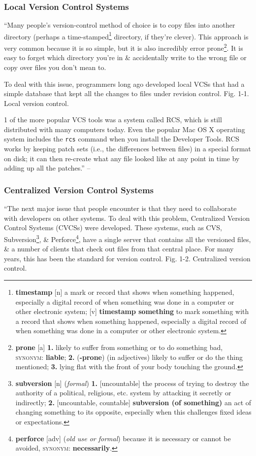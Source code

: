 \documentclass[oneside]{book}
\numberwithin{equation}{section}
\begin{document}
\subsubsection{Local Version Control Systems}
``Many people's version-control method of choice is to copy files into another directory (perhaps a time-stamped\footnote{\textbf{timestamp} [n] a mark or record that shows when something happened, especially a digital record of when something was done in a computer or other electronic system; [v] \textbf{timestamp something} to mark something with a record that shows when something happened, especially a digital record of when something was done in a computer or other electronic system.} directory, if they're clever). This approach is very common because it is so simple, but it is also incredibly error prone\footnote{\textbf{prone} [a] \textbf{1.} likely to suffer from something or to do something bad, \textsc{synonym}: \textbf{liable}; \textbf{2.} (\textbf{-prone}) (in adjectives) likely to suffer or do the thing mentioned; \textbf{3.} lying flat with the front of your body touching the ground.}. It is easy to forget which directory you're in \& accidentally write to the wrong file or copy over files you don't mean to.

To deal with this issue, programmers long ago developed local VCSs that had a simple database that kept all the changes to files under revision control. \textsf{Fig. 1-1. Local version control}.

1 of the more popular VCS tools was a system called RCS, which is still distributed with many computers today. Even the popular Mac OS X operating system includes the \texttt{rcs} command when you install the Developer Tools. RCS works by keeping patch sets (i.e., the differences between files) in a special format on disk; it can then re-create what any file looked like at any point in time by adding up all the patches.'' -- \cite[pp. 1--2]{Chacon_Straub2014}

\subsubsection{Centralized Version Control Systems}
``The next major issue that people encounter is that they need to collaborate with developers on other systems. To deal with this problem, Centralized Version Control Systems (CVCSs) were developed. These systems, such as CVS, Subversion\footnote{\textbf{subversion} [n] (\textit{formal}) \textbf{1.} [uncountable] the process of trying to destroy the authority of a political, religious, etc. system by attacking it secretly or indirectly; \textbf{2.} [uncountable, countable] \textbf{subversion (of something)} an act of changing something to its opposite, especially when this challenges fixed ideas or expectations.}, \& Perforce\footnote{\textbf{perforce} [adv] (\textit{old use or formal}) because it is necessary or cannot be avoided, \textsc{synonym}: \textbf{necessarily}.}, have a single server that contains all the versioned files, \& a number of clients that check out files from that central place. For many years, this has been the standard for version control. \textsf{Fig. 1-2. Centralized version control.}
\end{document}
